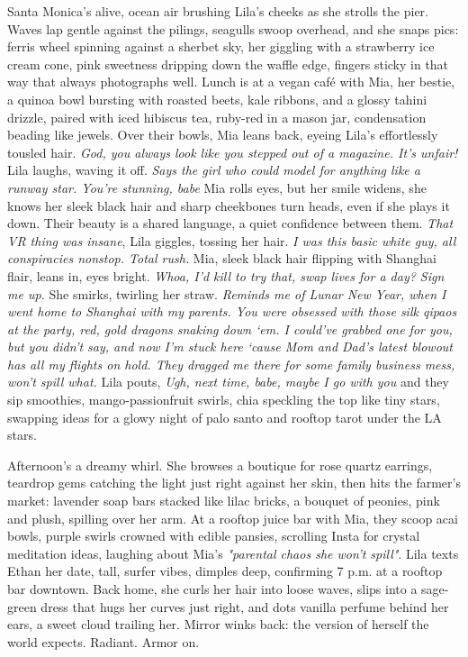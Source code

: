 \documentclass[12pt,oneside]{book}
\begin{document}
Santa Monica’s alive, ocean air brushing Lila’s cheeks as she strolls the pier. Waves lap gentle against the pilings, seagulls swoop overhead, and she snaps pics: ferris wheel spinning against a sherbet sky, her giggling with a strawberry ice cream cone, pink sweetness dripping down the waffle edge, fingers sticky in that way that always photographs well. Lunch is at a vegan café with Mia, her bestie, a quinoa bowl bursting with roasted beets, kale ribbons, and a glossy tahini drizzle, paired with iced hibiscus tea, ruby-red in a mason jar, condensation beading like jewels. Over their bowls, Mia leans back, eyeing Lila’s effortlessly tousled hair. \textit{God, you always look like you stepped out of a magazine. It’s unfair!} Lila laughs, waving it off. \textit{Says the girl who could model for anything like a runway star. You’re stunning, babe} Mia rolls eyes, but her smile widens, she knows her sleek black hair and sharp cheekbones turn heads, even if she plays it down. Their beauty is a shared language, a quiet confidence between them. \textit{That VR thing was insane}, Lila giggles, tossing her hair. \textit{I was this basic white guy, all conspiracies nonstop. Total rush.} Mia, sleek black hair flipping with Shanghai flair, leans in, eyes bright. \textit{Whoa, I’d kill to try that, swap lives for a day? Sign me up.} She smirks, twirling her straw. \textit{Reminds me of Lunar New Year, when I went home to Shanghai with my parents. You were obsessed with those silk qipaos at the party, red, gold dragons snaking down ‘em. I could’ve grabbed one for you, but you didn’t say, and now I’m stuck here ‘cause Mom and Dad’s latest blowout has all my flights on hold. They dragged me there for some family business mess, won’t spill what.} Lila pouts, \textit{Ugh, next time, babe, maybe I go with you} and they sip smoothies, mango-passionfruit swirls, chia speckling the top like tiny stars, swapping ideas for a glowy night of palo santo and rooftop tarot under the LA stars.

Afternoon’s a dreamy whirl. She browses a boutique for rose quartz earrings, teardrop gems catching the light just right against her skin, then hits the farmer’s market: lavender soap bars stacked like lilac bricks, a bouquet of peonies, pink and plush, spilling over her arm. At a rooftop juice bar with Mia, they scoop acai bowls, purple swirls crowned with edible pansies, scrolling Insta for crystal meditation ideas, laughing about Mia’s \textit{"parental chaos she won’t spill"}. Lila texts Ethan her date, tall, surfer vibes, dimples deep, confirming 7 p.m. at a rooftop bar downtown. Back home, she curls her hair into loose waves, slips into a sage-green dress that hugs her curves just right, and dots vanilla perfume behind her ears, a sweet cloud trailing her. Mirror winks back: the version of herself the world expects. Radiant. Armor on.
\end{document}
